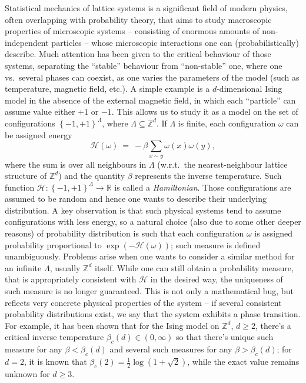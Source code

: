\documentclass[12pt]{article}
\renewcommand{\H}{\mathcal{H}}
\newcommand{\R}{\mathbb{R}}
\newcommand{\Z}{\mathbb{Z}}
\newcommand{\set}[1]{\left\{#1\right\}}
\newcommand{\ra}{\rightarrow}
\newcommand{\1}{\mathbbm{1}}
\newcommand{\5}{\vspace{0.5cm}}
\theoremstyle{definition}
\begin{document}
Statistical mechanics of lattice systems is a significant field of modern physics, often overlapping with probability theory, that aims to study macroscopic properties of microscopic systems -- consisting of enormous amounts of non-independent particles -- whose microscopic interactions one can (probabilistically) describe. Much attention has been given to the critical behaviour of those systems, separating the ``stable'' behaviour from ``non-stable'' one, where one vs.~several phases can coexist, as one varies the parameters of the model (such as temperature, magnetic field, etc.). A simple example is a $d$-dimensional Ising model in the absence of the external magnetic field, in which each ``particle'' can assume value either $+1$ or $-1$. This allows us to study it as a model on the set of configurations $\set{-1,+1}^{\Lambda}$, where $\Lambda\subseteq\Z^d$. If $\Lambda$ is finite, each configuration $\omega$ can be assigned energy
$$\H(\omega) ~=~ -\beta\sum_{x\sim y}\omega(x)\omega(y),$$
where the sum is over all neighbours in $\Lambda$ (w.r.t.~the nearest-neighbour lattice structure of $\Z^d$) and the quantity $\beta$ represents the inverse temperature. Such function $\H:\set{-1,+1}^{\Lambda}\ra\R$ is called a \textit{Hamiltonian}. Those configurations are assumed to be random and hence one wants to describe their underlying distribution. A key observation is that such physical systems tend to assume configurations with less energy, so a natural choice (also due to some other deeper reasons) of probability distribution is such that each configuration $\omega$ is assigned probability proportional to $\exp(-\H(\omega))$; such measure is defined unambiguously. Problems arise when one wants to consider a similar method for an infinite $\Lambda$, usually $\Z^d$ itself. While one can still obtain a probability measure, that is appropriately consistent with $\H$ in the desired way, the uniqueness of such measure is no longer guaranteed. This is not only a mathematical bug, but reflects very concrete physical properties of the system -- if several consistent probability distributions exist, we say that the system exhibits a phase transition. For example, it has been shown that for the Ising model on $\Z^d$, $d\geq 2$, there's a critical inverse temperature $\beta_c(d)\in(0,\infty)$ so that there's unique such measure for any $\beta<\beta_c(d)$ and several such measures for any $\beta>\beta_c(d)$; for $d=2$, it is known that $\beta_c(2)=\frac{1}{2}\log(1+\sqrt{2})$, while the exact value remains unknown for $d\geq 3$. \\
\end{document}
